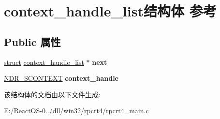 \hypertarget{structcontext__handle__list}{}\section{context\+\_\+handle\+\_\+list结构体 参考}
\label{structcontext__handle__list}
\subsection*{Public 属性}
\begin{DoxyCompactItemize}
\item 
\mbox{\label{structcontext__handle__list_ab5c9c97e3b037ca8afa797a12ba7f4ea}} 
\hyperlink{interfacestruct}{struct} \hyperlink{structcontext__handle__list}{context\+\_\+handle\+\_\+list} $\ast$ {\bfseries next}
\item 
\mbox{\label{structcontext__handle__list_aa735a4f840711ba99e0c6d10d70a300c}} 
\hyperlink{structtag_n_d_r___s_c_o_n_t_e_x_t}{N\+D\+R\+\_\+\+S\+C\+O\+N\+T\+E\+XT} {\bfseries context\+\_\+handle}
\end{DoxyCompactItemize}


该结构体的文档由以下文件生成\+:\begin{DoxyCompactItemize}
\item 
E\+:/\+React\+O\+S-\/0../dll/win32/rpcrt4/rpcrt4\+\_\+main.\+c\end{DoxyCompactItemize}
